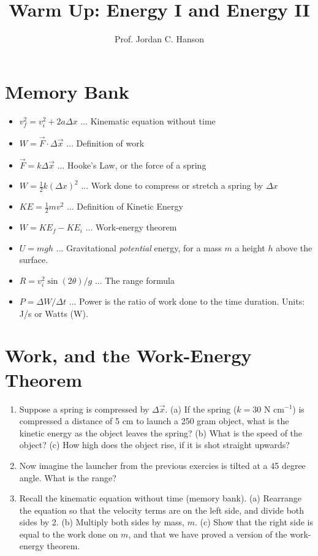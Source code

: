 \documentclass{article}
\begin{document}
\twocolumn

\title{Warm Up: Energy I and Energy II}
\author{Prof. Jordan C. Hanson}

\maketitle

\section{Memory Bank}

\begin{itemize}
\item $v_f^2 = v_i^2 + 2 a \Delta x$ ... Kinematic equation without time
\item $W = \vec{F} \cdot \Delta \vec{x}$ ... Definition of work
\item $\vec{F} = k\Delta \vec{x}$ ... Hooke's Law, or the force of a spring
\item $W = \frac{1}{2}k(\Delta x)^2$ ... Work done to compress or stretch a spring by $\Delta x$
\item $KE = \frac{1}{2}m v^2$ ... Definition of Kinetic Energy
\item $W = KE_f - KE_i$ ... Work-energy theorem
\item $U = mgh$ ... Gravitational \textit{potential} energy, for a mass $m$ a height $h$ above the surface.
\item $R = v_i^2 \sin(2\theta)/g$ ... The range formula
\item $P = \Delta W/\Delta t$ ... Power is the ratio of work done to the time duration.  Units: J/s or Watts (W).
\end{itemize}

\section{Work, and the Work-Energy Theorem}

\begin{enumerate}
\item Suppose a spring is compressed by $\Delta \vec{x}$.  (a) If the spring ($k = 30$ N cm$^{-1}$) is compressed a distance of 5 cm to launch a 250 gram object, what is the kinetic energy as the object leaves the spring? (b) What is the speed of the object? (c) How high does the object rise, if it is shot straight upwards? \\ \vspace{4cm}
\item Now imagine the launcher from the previous exercies is tilted at a 45 degree angle.  What is the range? \\ \vspace{2cm}
\item Recall the kinematic equation without time (memory bank). (a) Rearrange the equation so that the velocity terms are on the left side, and divide both sides by 2.  (b) Multiply both sides by mass, $m$.  (c) Show that the right side is equal to the work done on $m$, and that we have proved a version of the work-energy theorem. \\ \vspace{4cm}
\end{enumerate}
\end{document}
